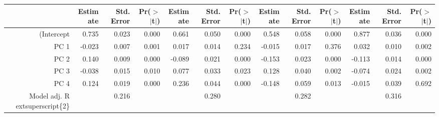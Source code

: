 \begin{table}[ht]
\centering
\begin{tabular}{rrrrrrrrrrrrr}
  \hline
 & Estimate & Std. Error & Pr($>$$|$t$|$) & Estimate & Std. Error & Pr($>$$|$t$|$) & Estimate & Std. Error & Pr($>$$|$t$|$) & Estimate & Std. Error & Pr($>$$|$t$|$) \\ 
  \hline
(Intercept & 0.735 & 0.023 & 0.000 & 0.661 & 0.050 & 0.000 & 0.548 & 0.058 & 0.000 & 0.877 & 0.036 & 0.000 \\ 
  PC 1 & -0.023 & 0.007 & 0.001 & 0.017 & 0.014 & 0.234 & -0.015 & 0.017 & 0.376 & 0.032 & 0.010 & 0.002 \\ 
  PC 2 & 0.140 & 0.009 & 0.000 & -0.089 & 0.021 & 0.000 & -0.153 & 0.023 & 0.000 & -0.113 & 0.014 & 0.000 \\ 
  PC 3 & -0.038 & 0.015 & 0.010 & 0.077 & 0.033 & 0.023 & 0.128 & 0.040 & 0.002 & -0.074 & 0.024 & 0.002 \\ 
  PC 4 & 0.124 & 0.019 & 0.000 & 0.236 & 0.044 & 0.000 & -0.148 & 0.059 & 0.013 & -0.015 & 0.039 & 0.692 \\ 
  Model adj. R	extsuperscript\{2\} &  & 0.216 &  &  & 0.280 &  &  & 0.282 &  &  & 0.316 &  \\ 
   \hline
\end{tabular}
\end{table}
